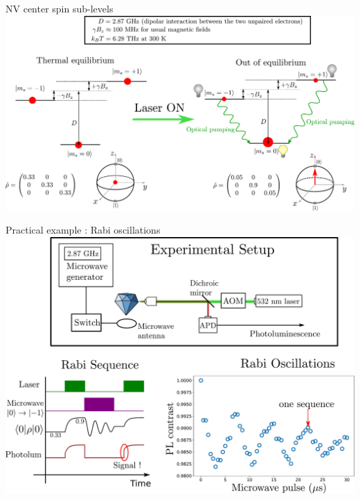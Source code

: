 \documentclass{beamer}
\begin{document}
\begin{frame}{NV center spin sub-levels}
\centering
\includegraphics[width=\textwidth,height=0.9\textheight,keepaspectratio]{slide_3_niveaux}
\end{frame}
\begin{frame}{Practical example : Rabi oscillations}
\centering
\includegraphics[width=\textwidth,height=0.9\textheight,keepaspectratio]{Slide_Rabi}
\end{frame}
\end{document}
